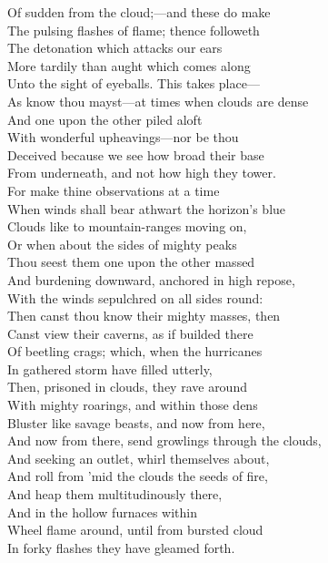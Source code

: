 Of sudden from the cloud;—and these do make\\
The pulsing flashes of flame; thence followeth\\
The detonation which attacks our ears\\
More tardily than aught which comes along\\
Unto the sight of eyeballs. This takes place—\\
As know thou mayst—at times when clouds are dense\\
And one upon the other piled aloft\\
With wonderful upheavings—nor be thou\\
Deceived because we see how broad their base\\
From underneath, and not how high they tower.\\
For make thine observations at a time\\
When winds shall bear athwart the horizon's blue\\
Clouds like to mountain-ranges moving on,\\
Or when about the sides of mighty peaks\\
Thou seest them one upon the other massed\\
And burdening downward, anchored in high repose,\\
With the winds sepulchred on all sides round:\\
Then canst thou know their mighty masses, then\\
Canst view their caverns, as if builded there\\
Of beetling crags; which, when the hurricanes\\
In gathered storm have filled utterly,\\
Then, prisoned in clouds, they rave around\\
With mighty roarings, and within those dens\\
Bluster like savage beasts, and now from here,\\
And now from there, send growlings through the clouds,\\
And seeking an outlet, whirl themselves about,\\
And roll from 'mid the clouds the seeds of fire,\\
And heap them multitudinously there,\\
And in the hollow furnaces within\\
Wheel flame around, until from bursted cloud\\
In forky flashes they have gleamed forth.\\
